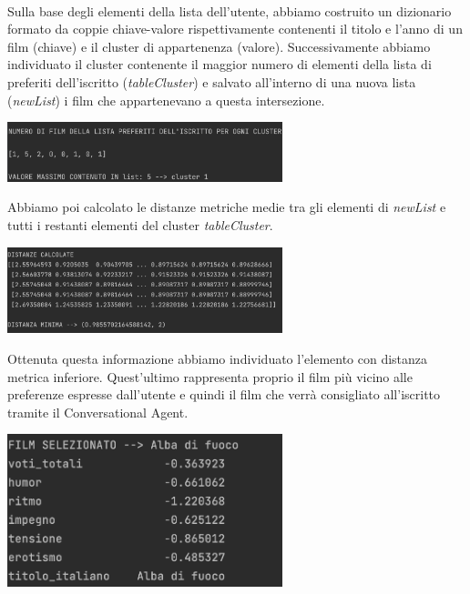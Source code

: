 \documentclass[a4paper, 10pt]{report}
\begin{document}
        \\Sulla base degli elementi della lista dell'utente, abbiamo costruito un dizionario formato da
        coppie chiave-valore rispettivamente contenenti il titolo e l'anno di un film (chiave) e il cluster di appartenenza (valore).
        Successivamente abbiamo individuato il cluster contenente il maggior numero di elementi della lista di preferiti dell'iscritto
        (\textit{tableCluster}) e salvato all'interno di una nuova lista (\textit{newList}) i film che appartenevano a questa intersezione.
        \begin{center}
            \includegraphics[width=8cm]{modelling/numeroFilmxCluster}\\
        \end{center}

        Abbiamo poi calcolato le distanze metriche medie tra gli elementi di \textit{newList} e tutti i restanti elementi
        del cluster \textit{tableCluster}.
        \begin{center}
            \includegraphics[width=8cm]{modelling/distanzeMetriche}\\
        \end{center}

        Ottenuta questa informazione abbiamo individuato l'elemento con distanza metrica inferiore. Quest'ultimo rappresenta proprio
        il film più vicino alle preferenze espresse dall'utente e quindi il film che verrà consigliato all'iscritto tramite il
        Conversational Agent.
        \begin{center}
            \includegraphics[width=8cm]{modelling/filmSelezionato}\\
        \end{center}
\end{document}

